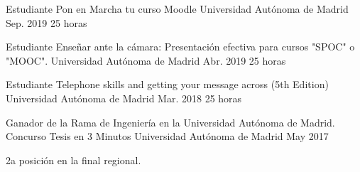 \begin{cventries}
  \cventry
    {Estudiante} %
    {Pon en Marcha tu curso Moodle} %
    {Universidad Autónoma de Madrid} %
    {Sep. 2019} %
    {25 horas
    }

  \cventry
    {Estudiante} %
    {Enseñar ante la cámara: Presentación efectiva para cursos "SPOC" o
"MOOC".} %
    {Universidad Autónoma de Madrid} %
    {Abr. 2019} %
    {25 horas
    }
    
  \cventry
    {Estudiante} %
    {Telephone skills and getting your message across (5th Edition)} %
    {Universidad Autónoma de Madrid} %
    {Mar. 2018} %
    {25 horas
    }

\end{cventries}

\begin{cventries}
  \cventry
    {Ganador de la Rama de Ingeniería en la Universidad Autónoma de Madrid.} %
    {Concurso Tesis en 3 Minutos} %
    {Universidad Autónoma de Madrid} %
    {May 2017} %
    {
      \begin{cvitems} %
        \item {2a posición en la final regional.}
      \end{cvitems}
    }
\end{cventries}